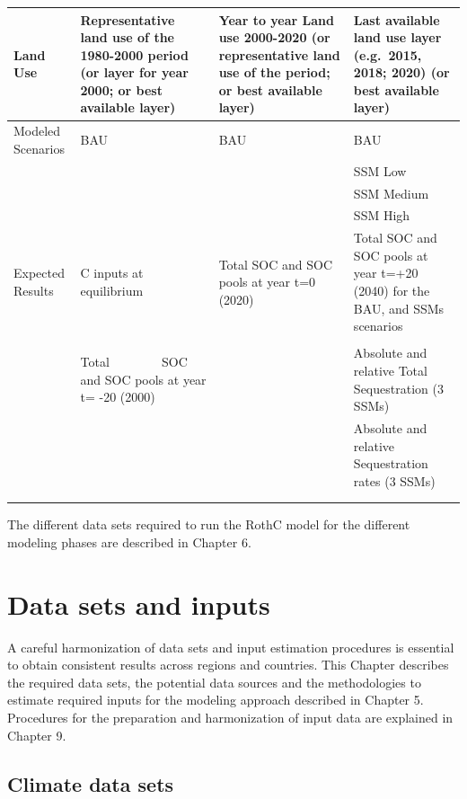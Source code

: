 \documentclass[
  10pt,
  b5paper,
]{book}
\begin{document}
\begin{table}
\begin{tabular}{l|l|l|l}
\hline
Land Use & Representative land use of the 1980-2000 period (or layer for year 2000; or best available layer) & Year to year Land use 2000-2020 (or representative land use of the period; or best available layer) & Last available land use layer (e.g. 2015, 2018; 2020) (or best available layer)\\
\hline
Modeled Scenarios & BAU & BAU & BAU\\
\hline
 &  &  & SSM Low\\
\hline
 &  &  & SSM Medium\\
\hline
 &  &  & SSM High\\
\hline
Expected Results & C inputs at equilibrium & Total SOC and SOC pools at year t=0 (2020) & Total SOC and SOC pools at year t=+20 (2040) for the BAU, and SSMs scenarios\\
\hline
 &  &  & \\
\hline
 & Total          SOC and SOC pools at year t= -20 (2000) &  & Absolute and relative Total Sequestration (3 SSMs)\\
\hline
 &  &  & Absolute and relative Sequestration rates (3 SSMs)\\
\hline
 &  &  & \\
\hline
 &  &  & \\
\hline
\end{tabular}
\end{table}

The different data sets required to run the RothC model for the different modeling phases are described in Chapter 6.

\hypertarget{data-sets-and-inputs}{%
\chapter{\textbar{} Data sets and inputs}\label{data-sets-and-inputs}}

A careful harmonization of data sets and input estimation procedures is essential to obtain consistent results across regions and countries. This Chapter describes the required data sets, the potential data sources and the methodologies to estimate required inputs for the modeling approach described in Chapter 5. Procedures for the preparation and harmonization of input data are explained in Chapter 9.

\hypertarget{climate-data-sets}{%
\section{Climate data sets}\label{climate-data-sets}}
\end{document}
